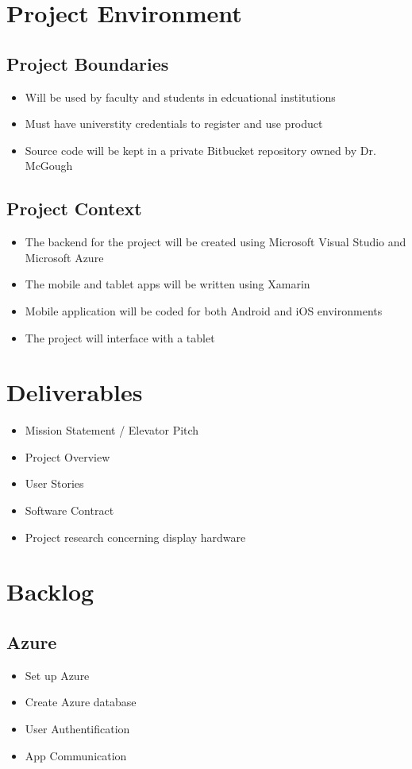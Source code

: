 \documentclass{article}
\begin{document}
\section*{Project Environment}
\subsection*{Project Boundaries}
\begin{itemize}
	\item Will be used by faculty and students in edcuational institutions
	\item Must have universtity credentials to register and use product
	\item Source code will be kept in a private Bitbucket repository owned by Dr. McGough
\end{itemize}

\subsection*{Project Context}
\begin{itemize}
	\item The backend for the project will be created using Microsoft Visual Studio and Microsoft Azure
	\item The mobile and tablet apps will be written using Xamarin
	\item Mobile application will be coded for both Android and iOS environments
	\item The project will interface with a tablet
\end{itemize} 

\section*{Deliverables}
\begin{itemize}
	\item Mission Statement / Elevator Pitch
	\item Project Overview
	\item User Stories
	\item Software Contract
	\item Project research concerning display hardware
\end{itemize}

\section*{Backlog}
\subsection*{Azure}
\begin{itemize}
	\item Set up Azure
	\item Create Azure database
	\item User Authentification
	\item App Communication
\end{itemize}
\end{document}
